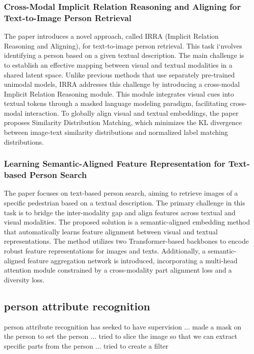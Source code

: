 \subsubsection{Cross-Modal Implicit Relation Reasoning and Aligning for Text-to-Image Person Retrieval}
The paper introduces a novel approach, called IRRA (Implicit Relation Reasoning and Aligning), for text-to-image person retrieval. This task i`nvolves identifying a person based on a given textual description. The main challenge is to establish an effective mapping between visual and textual modalities in a shared latent space. Unlike previous methods that use separately pre-trained unimodal models, IRRA addresses this challenge by introducing a cross-modal Implicit Relation Reasoning module. This module integrates visual cues into textual tokens through a masked language modeling paradigm, facilitating cross-modal interaction. To globally align visual and textual embeddings, the paper proposes Similarity Distribution Matching, which minimizes the KL divergence between image-text similarity distributions and normalized label matching distributions. 

\subsubsection{Learning Semantic-Aligned Feature Representation for Text-based Person Search}
The paper focuses on text-based person search, aiming to retrieve images of a specific pedestrian based on a textual description. The primary challenge in this task is to bridge the inter-modality gap and align features across textual and visual modalities. The proposed solution is a semantic-aligned embedding method that automatically learns feature alignment between visual and textual representations. The method utilizes two Transformer-based backbones to encode robust feature representations for images and texts. Additionally, a semantic-aligned feature aggregation network is introduced, incorporating a multi-head attention module constrained by a cross-modality part alignment loss and a diversity loss. 





\subsection{person attribute recognition}
person attribute recognition has seeked to have supervision 
... made a mask on the person to set the person 
... tried to slice the image so that we can extract specific parts from the person
... tried to create a filter 

